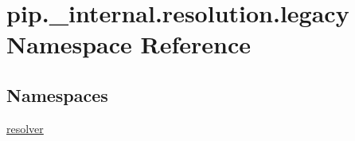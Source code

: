 \hypertarget{namespacepip_1_1__internal_1_1resolution_1_1legacy}{}\section{pip.\+\_\+internal.\+resolution.\+legacy Namespace Reference}
\label{namespacepip_1_1__internal_1_1resolution_1_1legacy}
\subsection*{Namespaces}
\begin{DoxyCompactItemize}
\item 
 \hyperlink{namespacepip_1_1__internal_1_1resolution_1_1legacy_1_1resolver}{resolver}
\end{DoxyCompactItemize}
